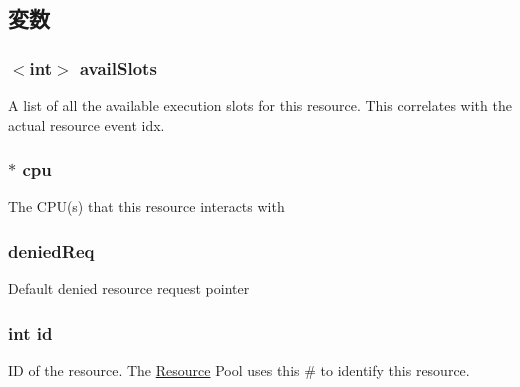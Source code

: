 \subsection{変数}
\hypertarget{classResource_a1dd2ecf45bf9024f273d09813d993f97}{
\subsubsection[{availSlots}]{$<$int$>$ {\bf availSlots}}}
\label{classResource_a1dd2ecf45bf9024f273d09813d993f97}
A list of all the available execution slots for this resource. This correlates with the actual resource event idx. \hypertarget{classResource_a41d682c28d0f49e04393c52815808782}{
\subsubsection[{cpu}]{$\ast$ {\bf cpu}}}
\label{classResource_a41d682c28d0f49e04393c52815808782}
The CPU(s) that this resource interacts with \hypertarget{classResource_a52489b62c55d7db3b70c3713b3000601}{
\subsubsection[{deniedReq}]{ {\bf deniedReq}}}
\label{classResource_a52489b62c55d7db3b70c3713b3000601}
Default denied resource request pointer \hypertarget{classResource_a7441ef0865bcb3db9b8064dd7375c1ea}{
\subsubsection[{id}]{\setlength{\rightskip}{0pt plus 5cm}int {\bf id}}}
\label{classResource_a7441ef0865bcb3db9b8064dd7375c1ea}
ID of the resource. The \hyperlink{classResource}{Resource} Pool uses this \# to identify this resource. 

